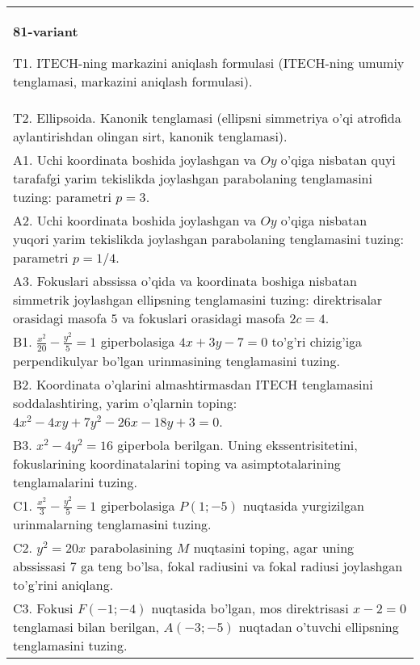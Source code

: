 \documentclass{article}
\begin{document}
\begin{tabular}{m{17cm}}
\textbf{81-variant}
\newline

T1. ITECH-ning markazini aniqlash formulasi (ITECH-ning umumiy tenglamasi, markazini aniqlash formulasi).\\

T2. Ellipsoida. Kanonik tenglamasi (ellipsni simmetriya o'qi atrofida aylantirishdan olingan sirt, kanonik tenglamasi).\\

A1. Uchi koordinata boshida joylashgan va $Oy$ o'qiga nisbatan quyi tarafafgi yarim tekislikda joylashgan parabolaning tenglamasini tuzing: parametri $p=3$.\\

A2. Uchi koordinata boshida joylashgan va $Oy$ o'qiga nisbatan yuqori yarim tekislikda joylashgan parabolaning tenglamasini tuzing: parametri $p=1/4$.\\

A3. Fokuslari abssissa o'qida va koordinata boshiga nisbatan simmetrik joylashgan ellipsning tenglamasini tuzing: direktrisalar orasidagi masofa $5$ va fokuslari orasidagi masofa $2c=4$.\\

B1. $\frac{x^{2}}{20} - \frac{y^{2}}{5} = 1$ giperbolasiga $4x + 3y - 7 = 0$ to'g'ri chizig'iga perpendikulyar bo'lgan urinmasining tenglamasini tuzing.  \\

B2. Koordinata o'qlarini almashtirmasdan ITECH tenglamasini soddalashtiring, yarim o'qlarnin toping: $4x^{2} - 4xy + 7y^{2} - 26x - 18y + 3 = 0$.\\

B3. $x^{2} - 4y^{2} = 16$ giperbola berilgan. Uning ekssentrisitetini, fokuslarining koordinatalarini toping va asimptotalarining tenglamalarini tuzing.\\

C1. $\frac{x^{2}}{3} - \frac{y^{2}}{5} = 1$ giperbolasiga $P(1; - 5)$ nuqtasida yurgizilgan urinmalarning tenglamasini tuzing.\\

C2. $y^{2} = 20x$ parabolasining $M$ nuqtasini toping, agar uning abssissasi 7 ga teng bo'lsa, fokal radiusini va fokal radiusi joylashgan to'g'rini aniqlang.\\

C3. Fokusi $F( - 1; - 4)$ nuqtasida bo'lgan, mos direktrisasi $x - 2 = 0$ tenglamasi bilan berilgan, $A( - 3; - 5)$ nuqtadan o'tuvchi ellipsning tenglamasini tuzing.  \\

\end{tabular}
\vspace{1cm}
\end{document}

